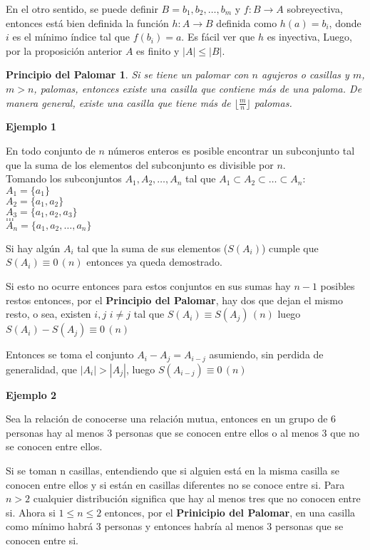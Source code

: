 \documentclass[a4paper,12pt]{report}
\newtheorem*{ppa}{Principio del Palomar}
\begin{document}
En el otro sentido, se puede definir $B={b_1,b_2,\dots,b_m}$ y $f:B\rightarrow A$ sobreyectiva, entonces está bien definida la función $h:A\rightarrow B$ definida como $h(a)=b_i$, donde $i$ es el mínimo índice tal que $f(b_i)=a$. Es fácil ver que $h$ es inyectiva, Luego, por la proposición anterior  $A$ es finito y $|A|\leq|B|$.

\begin{ppa}
 Si se tiene un palomar con $n$ agujeros o casillas y $m$, $m>n$, palomas, entonces existe una casilla que contiene más de una paloma. De manera general, existe una casilla que tiene más de $\lfloor\frac{m}{n}\rfloor$ palomas.
\end{ppa}

\textbf{Ejemplo 1}

 En todo conjunto de $n$ números enteros es posible encontrar un subconjunto tal que la suma de los elementos del subconjunto es divisible por $n$.\\

 Tomando los subconjuntos $A_1,A_2,\dots,A_n$ tal que $A_1\subset A_2 \subset\dots\subset A_n$:\\
 $A_1=\{a_1\}$\\
 $A_2=\{a_1,a_2\}$\\  
 $A_3=\{a_1,a_2,a_3\}$\\
 $\dots$\\
 $\dots$\\
 $A_n=\{a_1,a_2,\dots,a_n\}$
 
 Si hay algún $A_i$ tal que la suma de sus elementos ($S(A_i)$) cumple que $S(A_i)\equiv 0 \, (n)$ entonces ya queda demostrado.
 
 Si esto no ocurre entonces para estos conjuntos en sus sumas hay $n-1$ posibles restos entonces, por el \textbf{Principio del Palomar}, hay dos que dejan el mismo resto, o sea,
 existen $i,j$ $i\neq j$ tal que $S(A_i)\equiv S(A_j) \, (n)$ luego $S(A_i) - S(A_j)\equiv 0 \, (n)$
 
 Entonces se toma el conjunto $A_i - A_j = A_{i-j}$ asumiendo, sin perdida de generalidad, que $|A_i|>|A_j|$, luego $S(A_{i-j})\equiv 0 \, (n)$
 
 
 \textbf{Ejemplo 2}

 Sea la relación de conocerse una relación mutua, entonces en un grupo de 6 personas hay al menos 3 personas que se conocen entre ellos o al menos 3 que no se conocen entre ellos.
 
 Si se toman n casillas, entendiendo que si alguien está en la misma casilla se conocen entre ellos y si están en casillas diferentes no se conoce entre si. Para $n > 2$ cualquier distribución significa que hay al menos tres que no conocen entre si. Ahora si $1\leq n \leq 2$
 entonces, por el \textbf{Prinicipio del Palomar}, en una casilla como mínimo habrá 3 personas y entonces habría al menos 3 personas que se conocen entre si.
 
 
\end{document}
